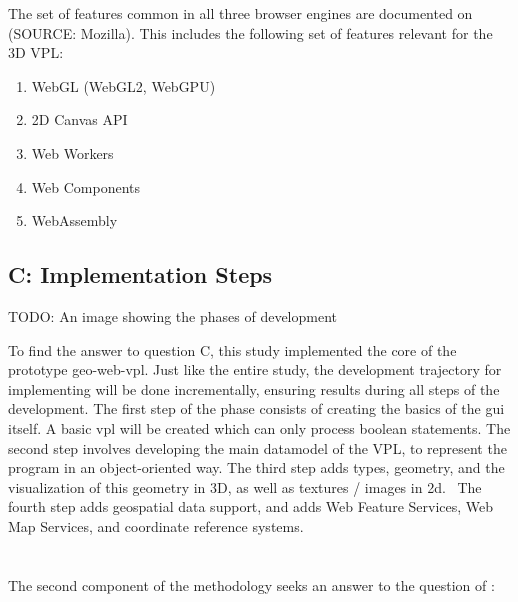 The set of features common in all three browser engines are documented on (SOURCE: Mozilla). 
This includes the following set of features relevant for the 3D VPL:
\begin{enumerate}[-]
  \item WebGL (WebGL2, WebGPU)
  \item 2D Canvas API
  \item Web Workers
  \item Web Components
  \item WebAssembly
\end{enumerate}

\subsection*{C: Implementation Steps}

\begin{note}
TODO: An image showing the phases of development
\end{note}

To find the answer to question C, this study implemented the core of the prototype \ac{geo-web-vpl}.
Just like the entire study, the development trajectory for implementing will be done incrementally, ensuring results during all steps of the development. 
The first step of the phase consists of creating the basics of the \ac{gui} itself. 
A basic \ac{vpl} will be created which can only process boolean statements. 
The second step involves developing the main datamodel of the VPL, to represent the program in an object-oriented way. 
The third step adds types, geometry, and the visualization of this geometry in 3D, as well as textures / images in 2d. \
The fourth step adds geospatial data support, and adds Web Feature Services, Web Map Services, and coordinate reference systems.  


\section{\mySubRQTwoTitle} 
\label{sec:method-two}
The second component of the methodology seeks an answer to the question of \mySubRQTwoTitle: \mySubRQTwo

